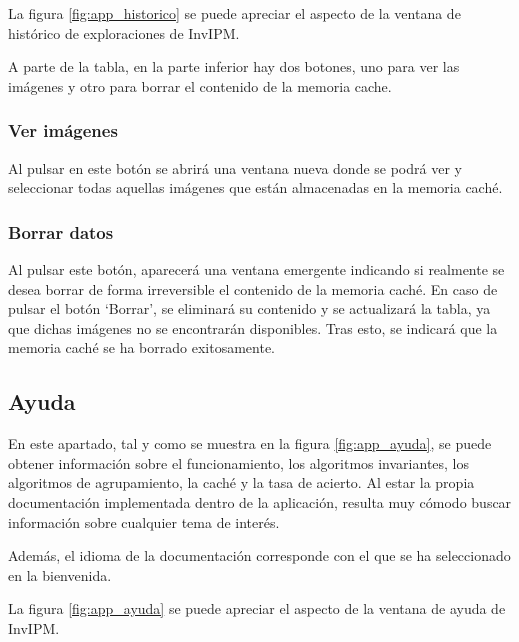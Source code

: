 
La figura \ref{fig:app_historico} se puede apreciar el aspecto de la ventana de histórico de exploraciones de InvIPM.

A parte de la tabla, en la parte inferior hay dos botones, uno para ver las imágenes y otro para borrar el contenido de la memoria cache. 

\subsubsection{Ver imágenes}\label{ver-imágenes}

Al pulsar en este botón se abrirá una ventana nueva donde se podrá ver y seleccionar todas aquellas imágenes que están almacenadas en la memoria caché.

\subsubsection{Borrar datos}\label{borrar-datos}

Al pulsar este botón, aparecerá una ventana emergente indicando si realmente se desea borrar de forma irreversible el contenido de la memoria caché. En caso de pulsar el botón `Borrar', se eliminará su contenido y se actualizará la tabla, ya que dichas imágenes no se encontrarán disponibles. Tras esto, se indicará que la memoria caché se ha borrado exitosamente.

\subsection{Ayuda}\label{ayuda}

En este apartado, tal y como se muestra en la figura \ref{fig:app_ayuda}, se puede obtener información sobre el funcionamiento, los algoritmos invariantes, los algoritmos de agrupamiento, la caché y la tasa de acierto. Al estar la propia documentación implementada dentro de la aplicación, resulta muy cómodo buscar información sobre cualquier tema de interés. 

Además, el idioma de la documentación corresponde con el que se ha seleccionado en la bienvenida.


La figura \ref{fig:app_ayuda} se puede apreciar el aspecto de la ventana de ayuda de InvIPM.